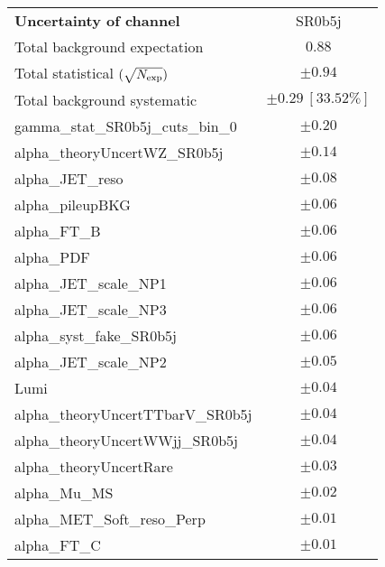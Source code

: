 \begin{table}
\begin{center}
\setlength{\tabcolsep}{0.0pc}
\begin{tabular*}{\textwidth}{@{\extracolsep{\fill}}lc}
\noalign{\smallskip}\hline\noalign{\smallskip}
{\bf Uncertainty of channel}                                    & SR0b5j            \\
\noalign{\smallskip}\hline\noalign{\smallskip}
Total background expectation             &  $0.88$       \\
\noalign{\smallskip}\hline\noalign{\smallskip}
Total statistical $(\sqrt{N_{\rm exp}})$              & $\pm 0.94$       \\
Total background systematic               & $\pm 0.29\ [33.52\%] $             \\
\noalign{\smallskip}\hline\noalign{\smallskip}
\noalign{\smallskip}\hline\noalign{\smallskip}
gamma\_stat\_SR0b5j\_cuts\_bin\_0         & $\pm 0.20$       \\
alpha\_theoryUncertWZ\_SR0b5j         & $\pm 0.14$       \\
alpha\_JET\_reso         & $\pm 0.08$       \\
alpha\_pileupBKG         & $\pm 0.06$       \\
alpha\_FT\_B         & $\pm 0.06$       \\
alpha\_PDF         & $\pm 0.06$       \\
alpha\_JET\_scale\_NP1         & $\pm 0.06$       \\
alpha\_JET\_scale\_NP3         & $\pm 0.06$       \\
alpha\_syst\_fake\_SR0b5j         & $\pm 0.06$       \\
alpha\_JET\_scale\_NP2         & $\pm 0.05$       \\
Lumi         & $\pm 0.04$       \\
alpha\_theoryUncertTTbarV\_SR0b5j         & $\pm 0.04$       \\
alpha\_theoryUncertWWjj\_SR0b5j         & $\pm 0.04$       \\
alpha\_theoryUncertRare         & $\pm 0.03$       \\
alpha\_Mu\_MS         & $\pm 0.02$       \\
alpha\_MET\_Soft\_reso\_Perp         & $\pm 0.01$       \\
alpha\_FT\_C         & $\pm 0.01$       \\

\end{tabular*}
\end{center}
\end{table}
